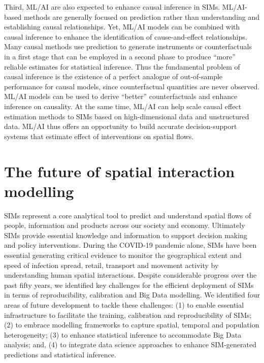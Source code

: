 \documentclass[11pt,letterpaper]{article}
\begin{document}
Third, ML/AI are also expected to enhance causal inference in SIMs.
ML/AI-based methods are generally focused on prediction rather than understanding and establishing causal relationships.
Yet, ML/AI models can be combined with causal inference to enhance the identification of cause-and-effect relationships.
Many causal methods use prediction to generate instruments or counterfactuals in a first stage that can be employed in a second phase to produce ``more'' reliable estimates for statistical inference.
Thus the fundamental problem of causal inference is the existence of a perfect analogue of out-of-sample performance for causal models, since counterfactual quantities are never observed.
ML/AI models can be used to derive ``better'' counterfactuals and enhance inference on causality.
At the same time, ML/AI can help scale causal effect estimation methods to SIMs based on high-dimensional data and unstructured data.
ML/AI thus offers an opportunity to build accurate decision-support systems that estimate effect of interventions on spatial flows.

\hypertarget{the-future-of-spatial-interaction-modelling}{%
\section{The future of spatial interaction modelling}\label{the-future-of-spatial-interaction-modelling}}

SIMs represent a core analytical tool to predict and understand spatial flows of people, information and products across our society and economy.
Ultimately SIMs provide essential knowledge and information to support decision making and policy interventions.
During the COVID-19 pandemic alone, SIMs have been essential generating critical evidence to monitor the geographical extent and speed of infection spread, retail, transport and movement activity by understanding human spatial interactions.
Despite considerable progress over the past fifty years, we identified key challenges for the efficient deployment of SIMs in terms of reproducibility, calibration and Big Data modelling.
We identified four areas of future development to tackle these challenges: (1) to enable essential infrastructure to facilitate the training, calibration and reproducibility of SIMs; (2) to embrace modelling frameworks to capture spatial, temporal and population heterogeneity; (3) to enhance statistical inference to accommodate Big Data analysis; and, (4) to integrate data science approaches to enhance SIM-generated predictions and statistical inference.
\end{document}
